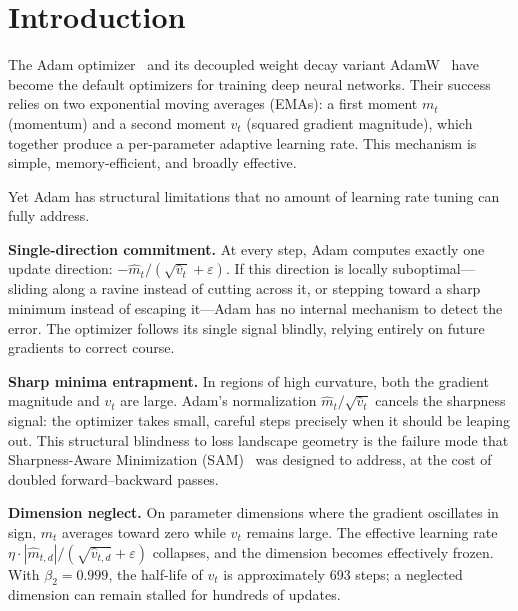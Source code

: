\documentclass[12pt]{article}
\begin{document}
\vspace{4pt}
\noindent{\color{rulecol}\rule{\linewidth}{0.6pt}}

\section{Introduction}
\label{sec:intro}

The Adam optimizer~\cite{kingma2015adam} and its decoupled weight decay
variant AdamW~\cite{loshchilov2019decoupled} have become the default
optimizers for training deep neural networks.
Their success relies on two exponential moving averages (EMAs): a first
moment $m_t$ (momentum) and a second moment $v_t$ (squared gradient
magnitude), which together produce a per-parameter adaptive learning rate.
This mechanism is simple, memory-efficient, and broadly effective.

Yet Adam has structural limitations that no amount of learning rate
tuning can fully address.

\textbf{Single-direction commitment.}
At every step, Adam computes exactly one update direction:
$-\hat{m}_t / (\sqrt{\hat{v}_t} + \varepsilon)$.
If this direction is locally suboptimal---sliding along a ravine
instead of cutting across it, or stepping toward a sharp minimum
instead of escaping it---Adam has no internal mechanism to detect the
error.
The optimizer follows its single signal blindly, relying entirely on
future gradients to correct course.

\textbf{Sharp minima entrapment.}
In regions of high curvature, both the gradient magnitude and $v_t$
are large.
Adam's normalization $\hat{m}_t / \sqrt{\hat{v}_t}$ cancels the
sharpness signal: the optimizer takes small, careful steps precisely
when it should be leaping out.
This structural blindness to loss landscape geometry is the failure mode
that Sharpness-Aware Minimization (SAM)~\cite{foret2021sharpnessaware}
was designed to address, at the cost of doubled forward--backward passes.

\textbf{Dimension neglect.}
On parameter dimensions where the gradient oscillates in sign, $m_t$
averages toward zero while $v_t$ remains large.
The effective learning rate
$\eta \cdot |\hat{m}_{t,d}| / (\sqrt{\hat{v}_{t,d}} + \varepsilon)$
collapses, and the dimension becomes effectively frozen.
With $\beta_2 = 0.999$, the half-life of $v_t$ is approximately
693 steps; a neglected dimension can remain stalled for hundreds of
updates.
\end{document}
